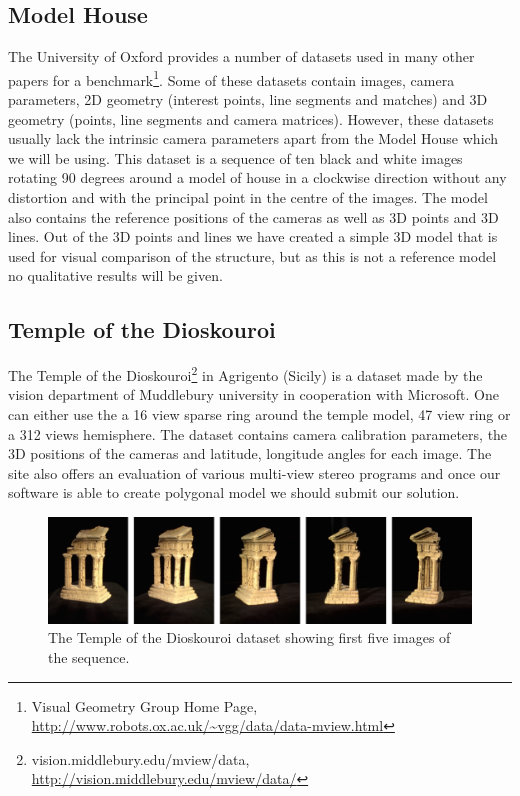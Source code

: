 \subsection*{Model House}
The University of Oxford provides a number of  datasets used in many other papers for a benchmark\footnote{Visual Geometry Group Home Page, \url{http://www.robots.ox.ac.uk/~vgg/data/data-mview.html}}. Some of these datasets contain images, camera parameters, 2D geometry (interest points, line segments and matches) and 3D geometry (points, line segments and camera matrices). However, these datasets usually lack the intrinsic camera parameters apart from the Model House which we will be using. This dataset is a sequence of ten black and white images rotating 90 degrees around a model of house in a clockwise direction without any distortion and with the principal point in the centre of the images. The model also contains the reference positions of the cameras as well as 3D points and 3D lines. Out of the 3D points and lines we have created a simple 3D model that is used for visual comparison of the structure, but as this is not a reference model no qualitative results will be given.

\subsection*{Temple of the Dioskouroi}
The Temple of the Dioskouroi\footnote{vision.middlebury.edu/mview/data, \url{http://vision.middlebury.edu/mview/data/}} in Agrigento (Sicily) is a dataset made by the vision department of Muddlebury university in cooperation with Microsoft. One can either use the a 16 view sparse ring around the temple model, 47 view ring or a 312 views hemisphere. The dataset contains camera calibration parameters, the 3D positions of the cameras and latitude, longitude angles for each image. The site also offers an evaluation of various multi-view stereo programs and once our software is able to create polygonal model we should submit our solution.

\begin{figure}[ht]
	\begin{center}
		\includegraphics[keepaspectratio,width=\textwidth]{fig/experiments-temple.pdf}
	\end{center}
	\caption{The Temple of the Dioskouroi dataset showing first five images of the sequence.}
	\label{fig:temple}
\end{figure}


